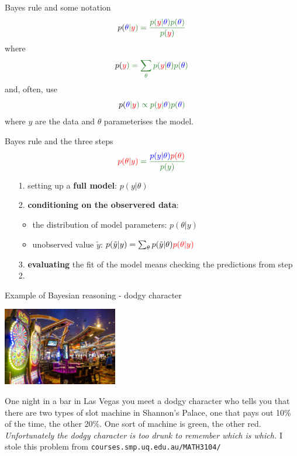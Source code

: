 \documentclass{beamer}
\newcommand{\cored}{\color{red}{}}
\newcommand{\coblu}{\color{blue}{}}
\newcommand{\cor}{\color{reddish}{}}
\newcommand{\cob}{\color{black}{}}
\begin{document}
\begin{frame}{Bayes rule and some notation}
\cor
  $$p(\coblu\theta\cor{}|\cored{}y\cor)=\frac{p(\cored{}y\cor|\coblu\theta\cor{})p(\coblu\theta\cor{})}{p(\cored{}y\cor)}$$
\cob{} where\cor
$$p(\cored{}y\cor)=\sum_\theta p(\cored{}y\cor|\coblu\theta\cor{})p(\coblu\theta\cor{})$$
\cob{} and, often, use
\cor
$$p(\coblu\theta\cor{}|\cored{}y\cor)\propto p(\cored{}y\cor|\coblu\theta\cor{})p(\coblu\theta\cor{})$$
\cob{}where \cored{}$y$\cob{} are the data and \coblu{}$\theta$\cob{} parameterises the model.
\end{frame}

\begin{frame}{Bayes rule and the three steps}
\cor
  $$\cored{}p(\theta|y)\cor=\frac{\coblu{}p(y|\theta)\cored{}p(\theta)}{p(y)}$$
\cob{}
\begin{enumerate}
  \item[1.] setting up a \textbf{full model}: \coblu{}$p(y|\theta)$\cob{}
  \item[2.] \textbf{conditioning on the observered data}:
    \begin{itemize}
      \item the distribution of model parameters: \cored{}$p(\theta|y)$\cob{}
      \item unobserved value \cor{}$\tilde{y}$\cob{}: \cor{}$p(\tilde{y}|y)=\sum_\theta p(\tilde{y}|\theta)\cored{}p(\theta|y)$\cor{}
    \end{itemize}
  \item[3.] \textbf{evaluating} the fit of the model means checking the predictions from step 2.
\end{enumerate}
\end{frame}

\begin{frame}{Example of Bayesian reasoning - dodgy character}
  \begin{center}
    \includegraphics[width=5cm]{casino.jpg}
\end{center}
  One night in a bar in Las Vegas you meet a \cor{}dodgy character\cob{} who tells
  you that there are two types of slot machine in Shannon's Palace, one
  that pays out 10\% of the time, the other 20\%. One sort of machine
  is \color{green}green\cob, the other \cored{}red\cob. \textsl{Unfortunately the \cor{}dodgy character\cob{} is too drunk to remember which is which.}
  \vfill
  \color{gray}I stole this problem from \texttt{courses.smp.uq.edu.au/MATH3104/}\cob
\end{frame}
\end{document}
